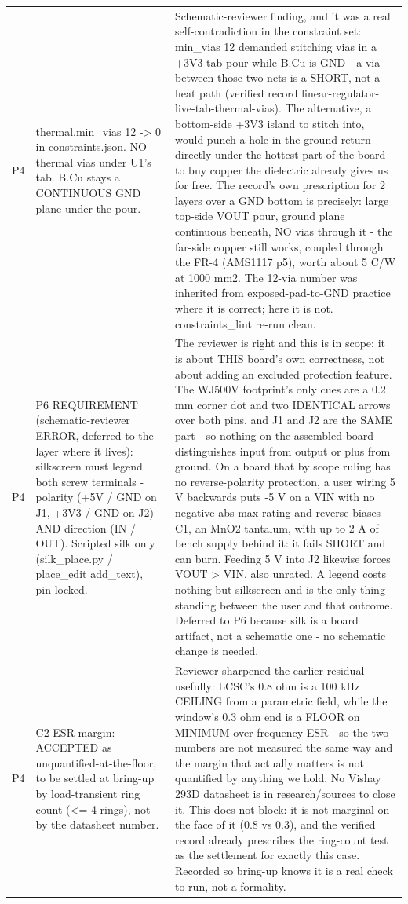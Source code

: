 \documentclass[11pt,a4paper]{article}
\begin{document}
{\begin{longtable}{lp{5.2cm}p{7.2cm}}
P4 & thermal.min\_vias 12 -\textgreater{} 0 in constraints.json. NO thermal vias under U1's tab. B.Cu stays a CONTINUOUS GND plane under the pour. & Schematic-reviewer finding, and it was a real self-contradiction in the constraint set: min\_vias 12 demanded stitching vias in a +3V3 tab pour while B.Cu is GND - a via between those two nets is a SHORT, not a heat path (verified record linear-regulator-live-tab-thermal-vias). The alternative, a bottom-side +3V3 island to stitch into, would punch a hole in the ground return directly under the hottest part of the board to buy copper the dielectric already gives us for free. The record's own prescription for 2 layers over a GND bottom is precisely: large top-side VOUT pour, ground plane continuous beneath, NO vias through it - the far-side copper still works, coupled through the FR-4 (AMS1117 p5), worth about 5 C/W at 1000 mm2. The 12-via number was inherited from exposed-pad-to-GND practice where it is correct; here it is not. constraints\_lint re-run clean. \\
P4 & P6 REQUIREMENT (schematic-reviewer ERROR, deferred to the layer where it lives): silkscreen must legend both screw terminals - polarity (+5V / GND on J1, +3V3 / GND on J2) AND direction (IN / OUT). Scripted silk only (silk\_place.py / place\_edit add\_text), pin-locked. & The reviewer is right and this is in scope: it is about THIS board's own correctness, not about adding an excluded protection feature. The WJ500V footprint's only cues are a 0.2 mm corner dot and two IDENTICAL arrows over both pins, and J1 and J2 are the SAME part - so nothing on the assembled board distinguishes input from output or plus from ground. On a board that by scope ruling has no reverse-polarity protection, a user wiring 5 V backwards puts -5 V on a VIN with no negative abs-max rating and reverse-biases C1, an MnO2 tantalum, with up to 2 A of bench supply behind it: it fails SHORT and can burn. Feeding 5 V into J2 likewise forces VOUT \textgreater{} VIN, also unrated. A legend costs nothing but silkscreen and is the only thing standing between the user and that outcome. Deferred to P6 because silk is a board artifact, not a schematic one - no schematic change is needed. \\
P4 & C2 ESR margin: ACCEPTED as unquantified-at-the-floor, to be settled at bring-up by load-transient ring count (\textless{}= 4 rings), not by the datasheet number. & Reviewer sharpened the earlier residual usefully: LCSC's 0.8 ohm is a 100 kHz CEILING from a parametric field, while the window's 0.3 ohm end is a FLOOR on MINIMUM-over-frequency ESR - so the two numbers are not measured the same way and the margin that actually matters is not quantified by anything we hold. No Vishay 293D datasheet is in research/sources to close it. This does not block: it is not marginal on the face of it (0.8 vs 0.3), and the verified record already prescribes the ring-count test as the settlement for exactly this case. Recorded so bring-up knows it is a real check to run, not a formality. \\

\end{longtable}}
\end{document}
